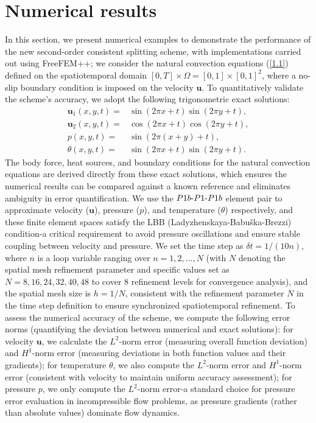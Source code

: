 \documentclass[10pt]{article}
\begin{document}
	\section{Numerical results}
\setcounter{equation}{0}
In this section, we present numerical examples to demonstrate the performance of the new second-order consistent splitting scheme, with implementations carried out using FreeFEM++; we consider the natural convection equations (\ref{1.1}) defined on the spatiotemporal domain \([0,T] \times \Omega = [0,1] \times [0,1]^2\), where a no-slip boundary condition is imposed on the velocity \(\bm{u}\). To quantitatively validate the scheme's accuracy, we adopt the following trigonometric exact solutions: 
\begin{align*} 
	\bm{u}_1(x,y,t) = & \sin(2\pi x + t)\sin(2\pi y + t), \\ \bm{u}_2(x,y,t) = & \cos(2\pi x + t)\cos(2\pi y + t), \\ p(x,y,t) = & \sin(2\pi(x + y) + t), \\ \theta(x,y,t) = & \sin(2\pi x + t)\sin(2\pi y + t).
\end{align*}
 The body force, heat sources, and boundary conditions for the natural convection equations are derived directly from these exact solutions, which ensures the numerical results can be compared against a known reference and eliminates ambiguity in error quantification. We use the \(P1b$-$P1$-$P1b\) element pair to approximate velocity (\(\bm{u}\)), pressure (\(p\)), and temperature (\(\theta\)) respectively, and these finite element spaces satisfy the LBB (Ladyzhenskaya-Babuška-Brezzi) condition-a critical requirement to avoid pressure oscillations and ensure stable coupling between velocity and pressure. We set the time step as \(\delta t = 1/(10n)\), where \(n\) is a loop variable ranging over \(n = 1, 2, \dots, N\) (with \(N\) denoting the spatial mesh refinement parameter and specific values set as \(N = 8, 16, 24, 32,40,48\) to cover 8 refinement levels for convergence analysis), and the spatial mesh size is \(h = 1/N\), consistent with the refinement parameter \(N\) in the time step definition to ensure synchronized spatiotemporal refinement. To assess the numerical accuracy of the scheme, we compute the following error norms (quantifying the deviation between numerical and exact solutions): for velocity \(\bm{u}\), we calculate the \(L^2\)-norm error (measuring overall function deviation) and \(H^1\)-norm error (measuring deviations in both function values and their gradients); for temperature \(\theta\), we also compute the \(L^2\)-norm error and \(H^1\)-norm error (consistent with velocity to maintain uniform accuracy assessment); for pressure \(p\), we only compute the \(L^2\)-norm error-a standard choice for pressure error evaluation in incompressible flow problems, as pressure gradients (rather than absolute values) dominate flow dynamics.
\end{document}
